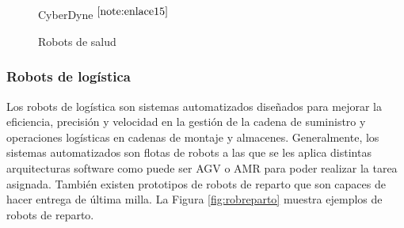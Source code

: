 \begin{figure}[ht!]
\begin{minipage}{0.25\linewidth}
    	\caption*{\centering CyberDyne $^{\ref{note:enlace15}}$}
    \end{minipage}
	\caption{Robots de salud}
	\label{fig:robsalud}
\end{figure}


\setcounter{footnote}{12} %

\setcounter{footnote}{13} %

\setcounter{footnote}{14} %

\setcounter{footnote}{15} %

\subsubsection{Robots de logística}

Los robots de logística son sistemas automatizados diseñados para mejorar la eficiencia, precisión y velocidad en la gestión de la cadena de suministro y operaciones logísticas en cadenas de montaje y almacenes. Generalmente, los sistemas automatizados son flotas de robots a las que se les aplica distintas arquitecturas software como puede ser \acs{AGV} o \acs{AMR} para poder realizar la tarea asignada. También existen prototipos de robots de reparto que son capaces de hacer entrega de última milla. La Figura \ref{fig:robreparto}  muestra ejemplos de robots de reparto. 

